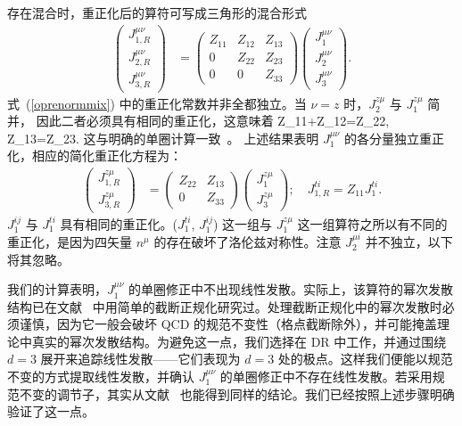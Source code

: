 存在混合时，重正化后的算符可写成三角形的混合形式
\begin{align}\label{oprenormmix}
\begin{pmatrix}
 J_{1, R}^{\mu\nu} \\  J_{2, R}^{\mu\nu} \\ J_{3, R}^{\mu\nu}
\end{pmatrix}
&=
\begin{pmatrix}
Z_{11} & Z_{12} & Z_{13}\\ 0 & Z_{22} & Z_{23} \\ 0 & 0 & Z_{33}
\end{pmatrix}
\begin{pmatrix}
 J_1^{\mu\nu}\\  J_2^{\mu\nu} \\ J_3^{\mu\nu}
\end{pmatrix}.
\end{align}
式~(\ref{oprenormmix}) 中的重正化常数并非全都独立。当 $\nu=z$ 时，$J_2^{z\mu}$ 与 $J_1^{z\mu}$ 简并，
因此二者必须具有相同的重正化，这意味着
\beq\label{Zrelation}
Z_{11}+Z_{12}=Z_{22}, \hspace{5em} Z_{13}=Z_{23}.
\eeq
这与明确的单圈计算一致~\cite{Dorn:1981wa}。
上述结果表明 $J_1^{\mu\nu}$ 的各分量独立重正化，相应的简化重正化方程为：
\begin{align}\label{oprenormmixsim2x2}
\begin{pmatrix}
 J_{1, R}^{z\mu} \\ J_{3, R}^{z\mu}
\end{pmatrix}
&=
\begin{pmatrix}
Z_{22} & Z_{13} \\  0 & Z_{33}
\end{pmatrix}
\begin{pmatrix}
 J_1^{z\mu} \\ J_3^{z\mu}
\end{pmatrix};\hspace{1em}
J_{1, R}^{ti}=Z_{11} J_1^{ti}.
\end{align}
$J_{1}^{ij}$ 与 $J_{1}^{ti}$ 具有相同的重正化。($J_{1}^{ti}$, $J_{1}^{ij}$) 这一组与 $J_1^{z\mu}$ 这一组算符之所以有不同的重正化，是因为四矢量 $n^\mu$ 的存在破坏了洛伦兹对称性。注意 $J_2^{\mu i}$ 并不独立，以下将其忽略。

我们的计算表明，$J_1^{\mu\nu}$ 的单圈修正中不出现线性发散。实际上，该算符的幂次发散结构已在文献~\cite{Wang:2017qyg,Wang:2017eel} 中用简单的截断正规化研究过。处理截断正规化中的幂次发散时必须谨慎，因为它一般会破坏 QCD 的规范不变性（格点截断除外），并可能掩盖理论中真实的幂次发散结构。为避免这一点，我们选择在 DR 中工作，并通过围绕 $d=3$ 展开来追踪线性发散——它们表现为 $d=3$ 处的极点。这样我们便能以规范不变的方式提取线性发散，并确认 $J_1^{\mu\nu}$ 的单圈修正中不存在线性发散。若采用规范不变的调节子，其实从文献~\cite{Wang:2017eel} 也能得到同样的结论。我们已经按照上述步骤明确验证了这一点。


